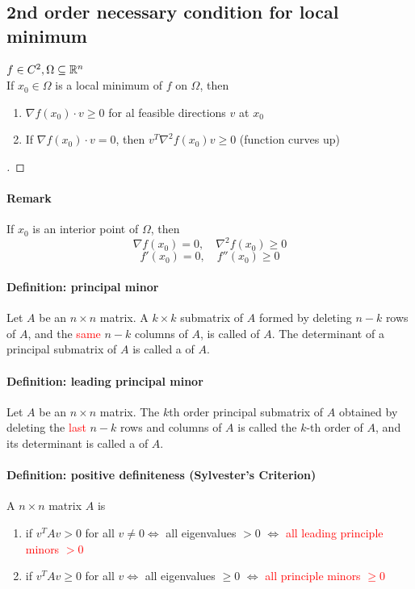 \documentclass[11pt]{article}
\begin{document}
\subsection{2nd order necessary condition for local minimum}
$f \in C^2, \Omega \subseteq \mathbb{R}^n$ \\
If $x_0 \in \Omega$ is a local minimum of $f$ on $\Omega$, then
\begin{enumerate}
	\item $\nabla f(x_0) \cdot v \geq 0$ for al feasible directions $v$ at $x_0$
	\item If $\nabla f(x_0) \cdot v = 0$, then $v^T \nabla^2 f(x_0) v \geq 0$
	(function curves up)
\end{enumerate}
\begin{proof}
[]
\end{proof}

\paragraph{Remark}
If $x_0$ is an interior point of $\Omega$, then
$$\nabla f(x_0) = 0, \quad \nabla^2 f(x_0)\geq 0$$
$$f'(x_0) = 0, \quad f''(x_0) \geq 0$$

\paragraph{Definition: principal minor}
Let $A$ be an $n \times n$ matrix. A $k \times k$ submatrix of $A$ formed by deleting $n-k$ rows of $A$, and the \textcolor{red}{same} $n - k$ columns of $A$, is called  of $A$. The determinant of a principal submatrix of $A$ is called a  of $A$.

\paragraph{Definition: leading principal minor}
Let $A$ be an $n \times n$ matrix. The $k$th order principal submatrix of $A$ obtained by deleting the \textcolor{red}{last} $n-k$ rows and columns of $A$ is called the $k$-th order  of $A$, and its determinant is called a  of $A$.

\paragraph{Definition: positive definiteness (Sylvester's Criterion)}
A $n \times n$ matrix $A$ is \\
\begin{enumerate}
	\item {} if $v^TAv > 0$ for all $v \neq 0 \iff $ all eigenvalues $>0$ $\iff$ \textcolor{red}{all leading principle minors $> 0$}
	\item {} if $v^TAv \geq 0$ for all $v \iff $ all eigenvalues $\geq 0$ $\iff$ \textcolor{red}{all principle minors $\geq 0$}
\end{enumerate}
\end{document}
